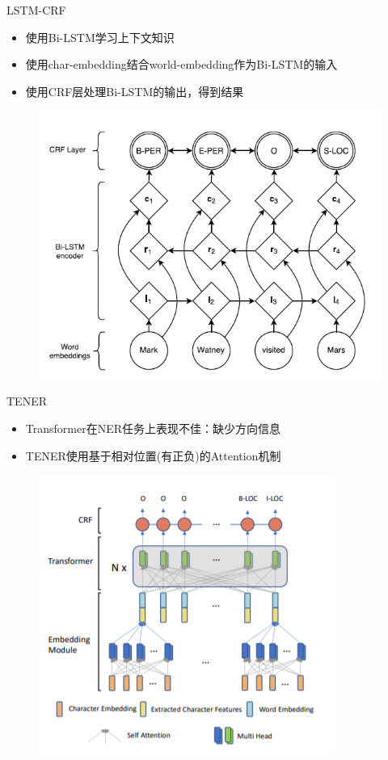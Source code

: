\documentclass[notheorems, aspectratio=54, compress]{beamer}
\begin{document}
\begin{frame}{LSTM-CRF}
  \begin{itemize}
    \item 使用Bi-LSTM学习上下文知识
    \item 使用char-embedding结合world-embedding作为Bi-LSTM的输入
    \item 使用CRF层处理Bi-LSTM的输出，得到结果
  \end{itemize}
  \begin{figure}
    \centering
    \includegraphics[width=0.8\linewidth,height=0.6\textheight,keepaspectratio]{LSTM-CRF Model}
  \end{figure}
\end{frame}

\begin{frame}{TENER}
	\begin{itemize}
		\item Transformer在NER任务上表现不佳：缺少方向信息
		\item TENER\cite{yan2019tener}使用基于相对位置(有正负)的Attention机制
	\end{itemize}
	\begin{figure}
		\centering
		\includegraphics[width=0.8\linewidth,height=0.6\textheight,keepaspectratio]{TENER Model}
	\end{figure}
\end{frame}
\end{document}
